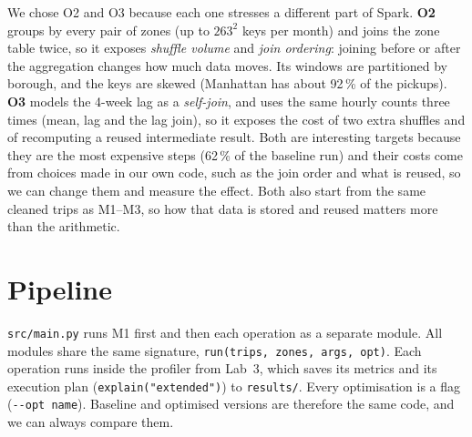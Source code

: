 \documentclass[sigconf]{acmart}
\newcommand{\opt}[1]{\texttt{-{}-opt #1}}
\begin{document}
We chose O2 and O3 because each one stresses a different part of Spark. \textbf{O2} groups by every pair of zones
(up to $263^2$ keys per month) and joins the zone table twice, so it exposes \emph{shuffle volume} and \emph{join
ordering}: joining before or after the aggregation changes how much data moves. Its windows are partitioned by
borough, and the keys are skewed (Manhattan has about 92\,\% of the pickups). \textbf{O3} models the 4-week lag as a
\emph{self-join}, and uses the same hourly counts three times (mean, lag and the lag join), so it exposes the cost of
two extra shuffles and of recomputing a reused intermediate result. Both are interesting targets because they are the
most expensive steps (62\,\% of the baseline run) and their costs come from choices made in our own code, such as the
join order and what is reused, so we can change them and measure the effect. Both also start from the same cleaned
trips as M1--M3, so how that data is stored and reused matters more than the arithmetic.

\section{Pipeline}

\texttt{src/main.py} runs M1 first and then each operation as a separate module. All modules share the same
signature, \texttt{run(trips, zones, args, opt)}. Each operation runs inside the profiler from Lab~3, which saves its
metrics and its execution plan (\texttt{explain("extended")}) to \texttt{results/}. Every optimisation is a flag
(\opt{name}). Baseline and optimised versions are therefore the same code, and we can always compare them.
\end{document}
